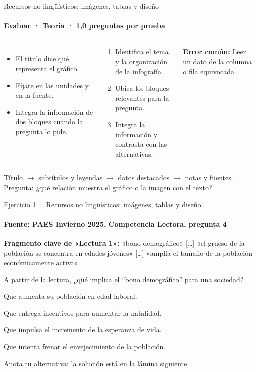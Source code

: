 \documentclass[aspectratio=169,11pt]{beamer}
\newcommand{\alternativa}[2]{\begin{opcion}\tecla{#1}\hspace{0.6em}#2\end{opcion}}
\newlength{\ajustealto}
\newenvironment{ajustar}[1][0.74\textheight]
  {\setlength{\ajustealto}{#1}\begin{lrbox}{\ajustecaja}\begin{minipage}{\textwidth}}
  {\end{minipage}\end{lrbox}%
   \ifdim\dimexpr\ht\ajustecaja+\dp\ajustecaja\relax>\ajustealto
     \resizebox*{!}{\ajustealto}{\usebox{\ajustecaja}}\else\usebox{\ajustecaja}\fi}
\begin{document}
\begin{frame}{Recursos no lingüísticos: imágenes, tablas y diseño}
\label{tema-cl-multimodal}
\framesubtitle{Evaluar · Teoría · 1,0 preguntas por prueba}
\begin{ajustar}
\begin{columns}[T,onlytextwidth]
\begin{itemize}\footnotesize
\item El título dice qué representa el gráfico.
\item Fíjate en las unidades y en la fuente.
\item Integra la información de dos bloques cuando la pregunta lo pide.
\end{itemize}
\begin{cajaregla}\scriptsize \begin{enumerate}\item Identifica el tema y la organización de la infografía.\item Ubica los bloques relevantes para la pregunta.\item Integra la información y contrasta con las alternativas.\end{enumerate}\end{cajaregla}
\begin{notagris}\scriptsize \textbf{Error común:} Leer un dato de la columna o fila equivocada.\end{notagris}
\end{columns}
\begin{cajaclave}\footnotesize
Título $\rightarrow$ subtítulos y leyendas $\rightarrow$ datos destacados $\rightarrow$ notas y fuentes. Pregunta: ¿qué relación muestra el gráfico o la imagen con el texto?
\end{cajaclave}
\end{ajustar}
\end{frame}

\begin{frame}{Ejercicio 1 · Recursos no lingüísticos: imágenes, tablas y diseño}
\framesubtitle{Fuente: PAES Invierno 2025, Competencia Lectora, pregunta 4}
\begin{ajustar}[0.7\textheight]
\begin{notagris}\scriptsize \textbf{Fragmento clave de «Lectura 1»:} «bono demográfico» [\ldots] «el grueso de la población se concentra en edades jóvenes» [\ldots] «amplía el tamaño de la población económicamente activa»\end{notagris}
{\small A partir de la lectura, ¿qué implica el “bono demográfico” para una sociedad?}
\vspace{0.4em}
\alternativa{A}{Que aumenta su población en edad laboral.}
\alternativa{B}{Que entrega incentivos para aumentar la natalidad.}
\alternativa{C}{Que impulsa el incremento de la esperanza de vida.}
\alternativa{D}{Que intenta frenar el envejecimiento de la población.}
\end{ajustar}
\vfill{\tiny\color{zinc500}\hfill Anota tu alternativa: la solución está en la lámina siguiente.}
\end{frame}
\end{document}
